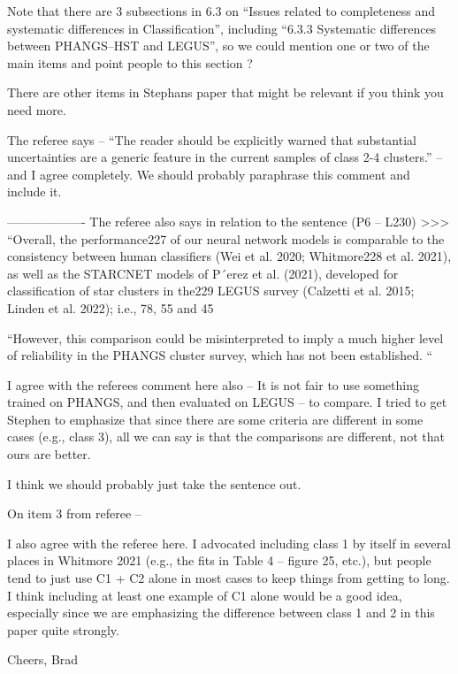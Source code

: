 Note that there are 3 subsections in 6.3 on “Issues related to completeness and systematic differences in
Classification”, including “6.3.3 Systematic differences between PHANGS–HST and LEGUS”, so  we could mention one or two of the main items and point people to this section ?

There are other items in Stephans paper that might be relevant if you think you need more. 

The referee says – “The reader should be explicitly warned that substantial uncertainties are a generic feature in the current samples of class 2-4 clusters.” – and I agree completely. We should probably paraphrase this comment and include it.

-------------------
The referee also says  in relation to the sentence (P6 – L230) >>> “Overall, the performance227
of our neural network models is comparable to the consistency between human classifiers (Wei et al. 2020; Whitmore228
et al. 2021), as well as the STARCNET models of P´erez et al. (2021), developed for classification of star clusters in the229
LEGUS survey (Calzetti et al. 2015; Linden et al. 2022); i.e., 78, 55 and 45 %

“However, this comparison could be misinterpreted to imply a much higher level of reliability in the PHANGS cluster survey, which has not been established. “

I agree with the referees comment here also – It is not fair to use something trained on PHANGS, and then evaluated on LEGUS – to compare. I tried to get Stephen to emphasize that since there are some criteria are different in some cases (e.g., class 3), all we can say is that the comparisons are different, not that ours are better.

I think we should probably just take the sentence out. 

On item 3 from referee – 

I also agree with the referee here. I advocated including class 1 by itself in several places in Whitmore 2021 (e.g., the fits in Table 4 – figure 25, etc.), but people tend to just use C1 + C2 alone in most cases to keep things from getting to long. I think including at least one example of C1 alone would be a good idea, especially since we are emphasizing the difference between class 1 and 2 in this paper quite strongly.

Cheers,
Brad





